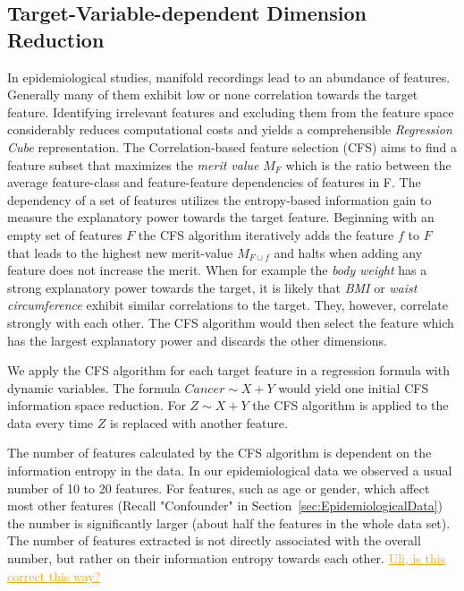 \documentclass[journal]{style/vgtc} 			          %
\newcommand{\com}[1]{\textcolor{orange}{\uline{#1}}}
\begin{document}
\subsection{Target-Variable-dependent Dimension Reduction}
In epidemiological studies, manifold recordings lead to an abundance of features.
Generally many of them exhibit low or none correlation towards the target feature.
Identifying irrelevant features and excluding them from the feature space considerably reduces computational costs and yields a comprehensible \emph{Regression Cube} representation.
The Correlation-based feature selection (CFS) \cite{CFS} aims to find a feature subset that maximizes the \emph{merit value} $M_F$ which is the ratio between the average feature-class and feature-feature dependencies of features in F.
The dependency of a set of features utilizes the entropy-based information gain to measure the explanatory power towards the target feature.
Beginning with an empty set of features $F$ the CFS algorithm iteratively adds the feature $f$ to $F$ that leads to the highest new merit-value $M_{F\cup f}$ and halts when adding any feature does not increase the merit.
When for example the \emph{body weight} has a strong explanatory power towards the target, it is likely that \emph{BMI} or \emph{waist circumference} exhibit similar correlations to the target.
They, however, correlate strongly with each other.
The CFS algorithm would then select the feature which has the largest explanatory power and discards the other dimensions.

We apply the CFS algorithm for each target feature in a regression formula with dynamic variables.
The formula $Cancer \sim X + Y$ would yield one initial CFS information space reduction.
For $Z \sim X + Y$ the CFS algorithm is applied to the data every time $Z$ is replaced with another feature.

The number of features calculated by the CFS algorithm is dependent on the information entropy in the data.
In our epidemiological data we observed a usual number of 10 to 20 features.
For features, such as age or gender, which affect most other features (Recall "Confounder" in Section~\ref{sec:EpidemiologicalData}) the number is significantly larger (about half the features in the whole data set).
The number of features extracted is not directly associated with the overall number, but rather on their information entropy towards each other.
\com{Uli, is this correct this way?}
\end{document}
